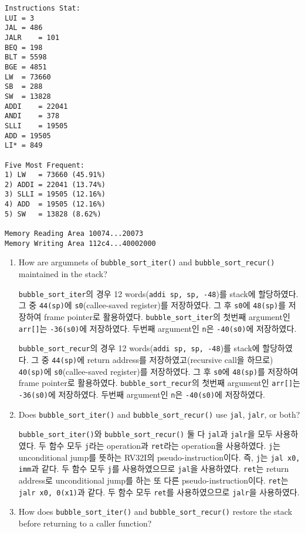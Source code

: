 \documentclass[
    a4paper,
    oneside,
    adjustmath,
    finemath,
    itemph,
    nonfrench,
    11pt
]{oblivoir}
\begin{document}
    \begin{lstlisting}[caption=instructions stat of recursive bubble sort, label=lst:recur_stat]
Instructions Stat:
LUI	= 3
JAL	= 486
JALR	= 101
BEQ	= 198
BLT	= 5598
BGE	= 4851
LW	= 73660
SB	= 288
SW	= 13828
ADDI	= 22041
ANDI	= 378
SLLI	= 19505
ADD	= 19505
LI*	= 849

Five Most Frequent:
1) LW	= 73660 (45.91%)
2) ADDI	= 22041 (13.74%)
3) SLLI	= 19505 (12.16%)
4) ADD	= 19505 (12.16%)
5) SW	= 13828 (8.62%)

Memory Reading Area 10074...20073
Memory Writing Area 112c4...40002000
    \end{lstlisting}
    \begin{enumerate}
        \item How are argumnets of \verb|bubble_sort_iter()| and \verb|bubble_sort_recur()| maintained in the stack?

        \verb|bubble_sort_iter|의 경우 12 words(\verb|addi sp, sp, -48|)를 stack에 할당하였다.
        그 중 \verb|44(sp)|에 \verb|s0|(callee-saved register)를 저장하였다.
        그 후 \verb|s0|에 \verb|48(sp)|를 저장하여 frame pointer로 활용하였다.
        \verb|bubble_sort_iter|의 첫번째 argument인 \verb|arr[]|는 \verb|-36(s0)|에 저장하였다.
        두번째 argument인 \verb|n|은 \verb|-40(s0)|에 저장하였다.

        \verb|bubble_sort_recur|의 경우 12 words(\verb|addi sp, sp, -48|)를 stack에 할당하였다.
        그 중 \verb|44(sp)|에 return address를 저장하였고(recursive call을 하므로) \verb|40(sp)|에 \verb|s0|(callee-saved register)를 저장하였다.
        그 후 \verb|s0|에 \verb|48(sp)|를 저장하여 frame pointer로 활용하였다.
        \verb|bubble_sort_recur|의 첫번째 argument인 \verb|arr[]|는 \verb|-36(s0)|에 저장하였다.
        두번째 argument인 \verb|n|은 \verb|-40(s0)|에 저장하였다.
        \item Does \verb|bubble_sort_iter()| and \verb|bubble_sort_recur()| use \verb|jal|, \verb|jalr|, or both?

        \verb|bubble_sort_iter()|와 \verb|bubble_sort_recur()| 둘 다 \verb|jal|과 \verb|jalr|을 모두 사용하였다.
        두 함수 모두 \verb|j|라는 operation과 \verb|ret|라는 operation을 사용하였다.
        \verb|j|는 unconditional jump를 뜻하는 RV32I의 pseudo-instruction이다.
        즉, \verb|j|는 \verb|jal x0, imm|과 같다.
        두 함수 모두 \verb|j|를 사용하였으므로 \verb|jal|을 사용하였다.
        \verb|ret|는 return address로 unconditional jump를 하는 또 다른 pseudo-instruction이다.
        \verb|ret|는 \verb|jalr x0, 0(x1)|과 같다.
        두 함수 모두 \verb|ret|를 사용하였으므로 \verb|jalr|을 사용하였다.
        \item How does \verb|bubble_sort_iter()| and \verb|bubble_sort_recur()| restore the stack before returning to a caller function?


\end{enumerate}
\end{document}
